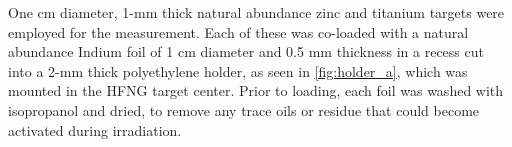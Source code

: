 \documentclass[5p]{elsarticle}
\newcommand{\comment}[1]{\todo[color=blue!20!white,inline]{ASV: #1}}
\begin{document}

One cm diameter, 1-mm thick natural abundance zinc and titanium targets were employed for the measurement.
Each of these was  co-loaded with a natural abundance Indium foil of 1 cm diameter and 0.5 mm thickness in a recess cut into a 2-mm thick polyethylene holder, as seen in \autoref{fig:holder_a}, which was mounted in the HFNG target center.
Prior to loading, each foil was washed with isopropanol and dried, to remove any trace oils or residue that could become activated during irradiation.




\end{document}
